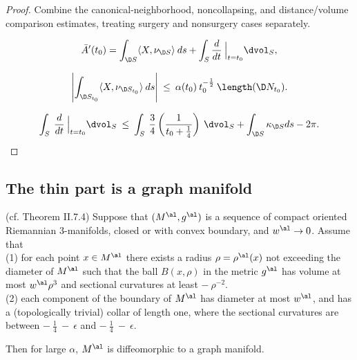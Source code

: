 \begin{proof}
\sketch Combine the canonical-neighborhood, noncollapsing, and distance/volume comparison estimates, treating surgery and nonsurgery cases separately.

\begin{equation}
\label{eqninitial}
\bar A'(t_0)=\int_{\D S}\langle X,\nu_{\D S}\rangle\:ds
+\int_S\frac{d}{dt} \: \Big|_{t=t_0} \dvol_S,
\end{equation}

\begin{equation}
\label{eqnbdyterm}
\left|\int_{\D S_{t_0}}\langle X,\nu_{\D S_{t_0}}\rangle\:ds\right| \:
\leq \: \alpha(t_0) \: t_0^{-\frac12} \: \length(\D N_{t_0}).
\end{equation}

\begin{equation} \label{evolve}
\int_S\:\frac{d}{dt} \: \Big|_{t=t_0} \dvol_S \: \le \:
\int_S\:\frac34\left(\frac{1}{t_0+\frac14}\right) \: \dvol_S+\int_{\D S}\kappa_{\D S}ds-2\pi.
\end{equation}
\end{proof}

\subsection{The thin part is a graph manifold}
 \label{II.7.4}

\begin{theorem}
  \label{thm:kl-thin-part-graph-manifold-existence-thick-thin-geometry}
 (cf. Theorem II.7.4) \label{thmII.7.4}
Suppose that $(M^\al, g^\al)$ is a sequence of compact oriented Riemannian
$3$-manifolds, closed or with convex boundary, and $w^\al \rightarrow 0$.
Assume that \\
(1) for each point $x \in M^\al$ there exists a radius $\rho = \rho^\al(x)$
not exceeding the diameter of $M^\al$
such that
the ball $B(x, \rho)$ in the metric $g^\al$ has volume at most
$w^\al \rho^3$ and sectional curvatures at least $- \: \rho^{-2}$.\\
(2) each component of the boundary of $M^\al$ has diameter at most
$w^\al$, and has a (topologically trivial) collar of length one, where
the sectional curvatures are between $- \: \frac14 \: - \: \epsilon$ and
$- \: \frac14 \: - \: \epsilon$.

Then for large $\alpha$, $M^\al$ is diffeomorphic to a graph manifold.
\end{theorem}

